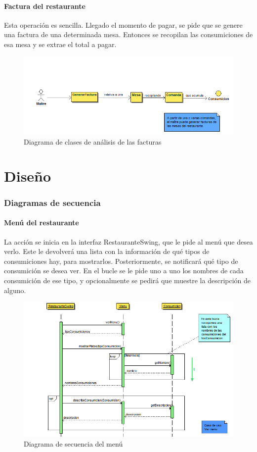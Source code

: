 \documentclass[spanish,a4paper,11pt, twoside]{report}	%
\begin{document}
		\subsection{Factura del restaurante}
		Esta operación es sencilla. Llegado el momento de pagar, se pide que se genere una factura de una determinada mesa. Entonces se recopilan las consumiciones de esa mesa y se extrae el total a pagar.
		\begin{figure}[!h]
		\centering
		\includegraphics[scale=0.5]{DCAfactura.png}
		\caption{Diagrama de clases de análisis de las facturas}
		\end{figure}




\setcounter{section}{0}
\part{Diseño}
	\section{Diagramas de secuencia}
		\subsection{Menú del restaurante}
		La acción se inicia en la interfaz RestauranteSwing, que le pide al menú que desea verlo. Este le devolverá una lista con la información de qué tipos de consumiciones hay, para mostrarlos. Posteriormente, se notificará qué tipo de consumición se desea ver. En el bucle se le pide uno a uno los nombres de cada consumición de ese tipo, y opcionalmente se pedirá que muestre la descripción de alguno. 
		\begin{figure}[!h]
		\centering
		\includegraphics[scale=0.5]{DSvermenu.png}
		\caption{Diagrama de secuencia del menú}
		\end{figure}
\end{document}
